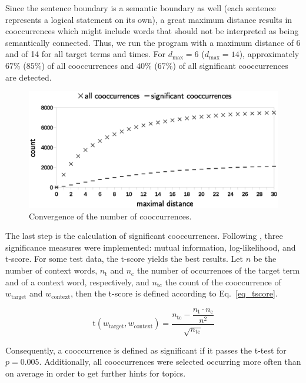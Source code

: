 \documentclass[10pt,a4paper,twocolumn]{scrartcl}
\begin{document}
Since the sentence boundary is a semantic boundary as well (each sentence represents a logical statement on its own), a great maximum distance results in cooccurrences which might include words that should not be interpreted as being semantically connected. Thus, we run the program with a maximum distance of 6 and of 14 for all target terms and times. For  $d_\text{max} = 6$ ($d_\text{max} = 14$), approximately $67\%$ ($85\%$) of all cooccurrences and $40\%$ ($67\%$) of all significant cooccurrences are detected. 


\begin{figure}
\includegraphics[width=\columnwidth]{figures/distance_eps}
\caption{Convergence of the number of cooccurrences.} \label{fig:distance}
\end{figure}

The last step is the calculation of significant cooccurrences. Following \citep{Bordag2008, Manning+Schuetze:2003}, three significance measures were implemented: mutual information, log-likelihood, and t-score. For some test data, the t-score yields the best results. Let $n$ be the number of context words, $n_\text{t}$ and $n_\text{c}$ the number of occurrences of the target term and of a context word, respectively, and $n_{\text{t}\text{c}}$ the count of the cooccurrence of $w_\text{target}$ and $w_\text{context}$, then the t-score is defined according to Eq.~\ref{eq_tscore}.

\begin{equation}
\text{t}(w_\text{target}, w_\text{context}) = \frac{n_{\text{t}\text{c}} - \dfrac{n_\text{t} \cdot n_\text{c}}{n^2}}{\sqrt{n_{\text{t}\text{c}}}} \label{eq_tscore}
\end{equation}

 Consequently, a cooccurrence is defined as significant if it passes the t-test for $p = 0.005$. Additionally, all cooccurrences were selected occurring more often than on average in order to get further hints for topics. 
\end{document}
